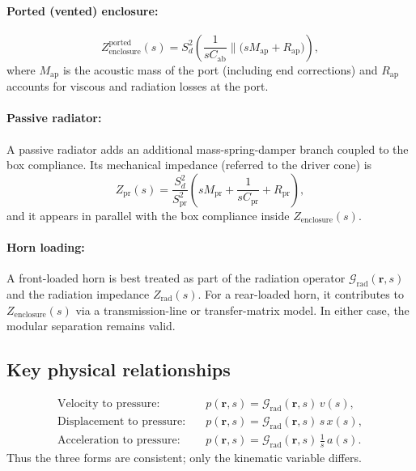 \paragraph{Ported (vented) enclosure:}
\[
\boxed{Z_{\mathrm{enclosure}}^{\text{ported}}(s)
=S_d^2\left(
\frac{1}{sC_{\mathrm{ab}}}
\parallel
\bigl(sM_{\mathrm{ap}}+R_{\mathrm{ap}}\bigr)
\right)},
\]
where \(M_{\mathrm{ap}}\) is the acoustic mass of the port (including end corrections) and \(R_{\mathrm{ap}}\) accounts for viscous and radiation losses at the port.

\paragraph{Passive radiator:}
A passive radiator adds an additional mass-spring-damper branch coupled to the box compliance. Its mechanical impedance (referred to the driver cone) is
\[
Z_{\mathrm{pr}}(s)=\frac{S_d^2}{S_{\mathrm{pr}}^2}\left(sM_{\mathrm{pr}}+\frac{1}{sC_{\mathrm{pr}}}+R_{\mathrm{pr}}\right),
\]
and it appears in parallel with the box compliance inside \(Z_{\mathrm{enclosure}}(s)\).

\paragraph{Horn loading:}
A front-loaded horn is best treated as part of the radiation operator \(\mathcal{G}_{\mathrm{rad}}(\mathbf{r},s)\) and the radiation impedance \(Z_{\mathrm{rad}}(s)\). For a rear-loaded horn, it contributes to \(Z_{\mathrm{enclosure}}(s)\) via a transmission-line or transfer-matrix model. In either case, the modular separation remains valid.

\subsection{Key physical relationships}

\begin{align*}
\text{Velocity to pressure:} &\quad p(\mathbf{r},s)=\mathcal{G}_{\mathrm{rad}}(\mathbf{r},s)\,v(s),\\
\text{Displacement to pressure:} &\quad p(\mathbf{r},s)=\mathcal{G}_{\mathrm{rad}}(\mathbf{r},s)\,s\,x(s),\\
\text{Acceleration to pressure:} &\quad p(\mathbf{r},s)=\mathcal{G}_{\mathrm{rad}}(\mathbf{r},s)\,\frac{1}{s}\,a(s).
\end{align*}
Thus the three forms are consistent; only the kinematic variable differs.

